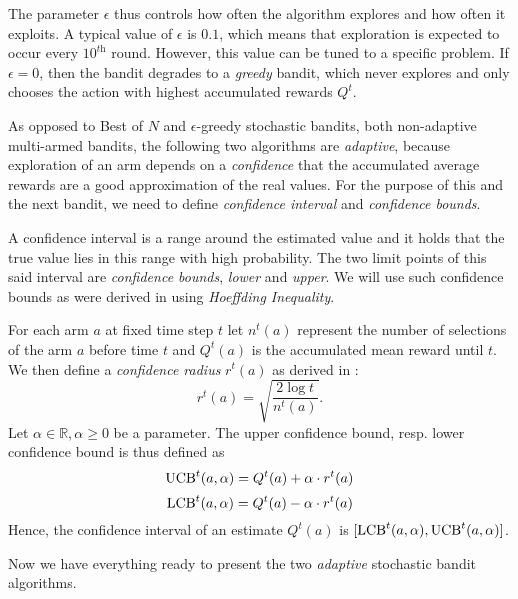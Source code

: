 \documentclass[../main.tex]{subfiles}
\begin{document}
The parameter $\epsilon$ thus controls how often the algorithm explores and how often it exploits.
A typical value of $\epsilon$ is $0.1$, which means that exploration is expected to occur every $10^{\textit{th}}$ round.
However, this value can be tuned to a specific problem.
If $\epsilon = 0$, then the bandit degrades to a \textit{greedy} bandit, which never explores and only chooses the action with highest accumulated rewards $Q^t$.

As opposed to Best of $N$ and $\epsilon$-greedy stochastic bandits, both non-adaptive multi-armed bandits, the following two algorithms are \textit{adaptive}, because exploration of an arm depends on a \textit{confidence} that the accumulated average rewards are a good approximation of the real values.
For the purpose of this and the next bandit, we need to define \textit{confidence interval} and \textit{confidence bounds}.

A confidence interval is a range around the estimated value and it holds that the true value lies in this range with high probability.
The two limit points of this said interval are \textit{confidence bounds}, \textit{lower} and \textit{upper}.
We will use such confidence bounds as were derived in \cite{bandits} using \textit{Hoeffding Inequality}.
\begin{definition}\label{bandit:stochastic:confidence}
    For each arm $a$ at fixed time step $t$ let $n^t(a)$ represent the number of selections of the arm $a$ before time $t$ and $Q^t(a)$ is the accumulated mean reward until $t$.
    We then define a \textit{confidence radius} $r^t(a)$ as derived in \cite{bandits}:
    \begin{equation}
        r^t(a) = \sqrt{\frac{2 \log{t}}{n^t(a)}}.
    \end{equation}
    Let $\alpha \in \mathbb{R}, \alpha \geq 0$ be a parameter.
    The upper confidence bound, resp. lower confidence bound is thus defined as
    \begin{equation}
        \text{UCB}^t(a, \alpha) = Q^t(a) + \alpha \cdot r^t(a)
    \end{equation}
    \begin{equation}
        \text{LCB}^t(a, \alpha) = Q^t(a) - \alpha \cdot r^t(a)\\
    \end{equation}
    Hence, the confidence interval of an estimate $Q^t(a)$ is $[\text{LCB}^t(a, \alpha), \text{UCB}^t(a, \alpha)]$.
\end{definition}
Now we have everything ready to present the two \textit{adaptive} stochastic bandit algorithms.
\end{document}
